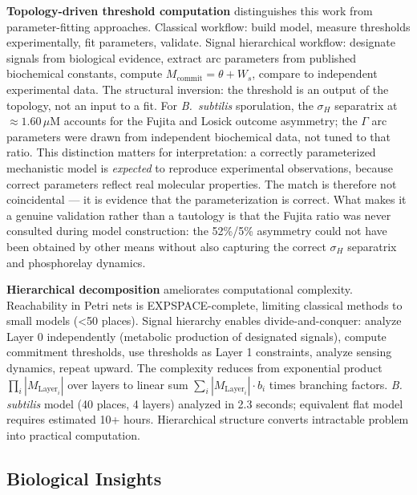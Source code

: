 \documentclass[10pt,letterpaper]{article}
\begin{document}
\textbf{Topology-driven threshold computation} distinguishes this work from parameter-fitting approaches. Classical workflow: build model, measure thresholds experimentally, fit parameters, validate. Signal hierarchical workflow: designate signals from biological evidence, extract arc parameters from published biochemical constants, compute $M_{\text{commit}} = \theta + W_s$, compare to independent experimental data. The structural inversion: the threshold is an output of the topology, not an input to a fit. For \textit{B.\ subtilis} sporulation, the $\sigma_H$ separatrix at $\approx 1.60\,\mu$M accounts for the Fujita and Losick outcome asymmetry; the $\Gamma$ arc parameters were drawn from independent biochemical data, not tuned to that ratio. This distinction matters for interpretation: a correctly parameterized mechanistic model is \textit{expected} to reproduce experimental observations, because correct parameters reflect real molecular properties. The match is therefore not coincidental --- it is evidence that the parameterization is correct. What makes it a genuine validation rather than a tautology is that the Fujita ratio was never consulted during model construction: the 52\%/5\% asymmetry could not have been obtained by other means without also capturing the correct $\sigma_H$ separatrix and phosphorelay dynamics.

\textbf{Hierarchical decomposition} ameliorates computational complexity. Reachability in Petri nets is EXPSPACE-complete, limiting classical methods to small models (<50 places). Signal hierarchy enables divide-and-conquer: analyze Layer 0 independently (metabolic production of designated signals), compute commitment thresholds, use thresholds as Layer 1 constraints, analyze sensing dynamics, repeat upward. The complexity reduces from exponential product $\prod_i |M_{\text{Layer}_i}|$ over layers to linear sum $\sum_i |M_{\text{Layer}_i}| \cdot b_i$ times branching factors. \textit{B. subtilis} model (40 places, 4 layers) analyzed in 2.3 seconds; equivalent flat model requires estimated 10+ hours. Hierarchical structure converts intractable problem into practical computation.

\subsection{Biological Insights}
\end{document}
